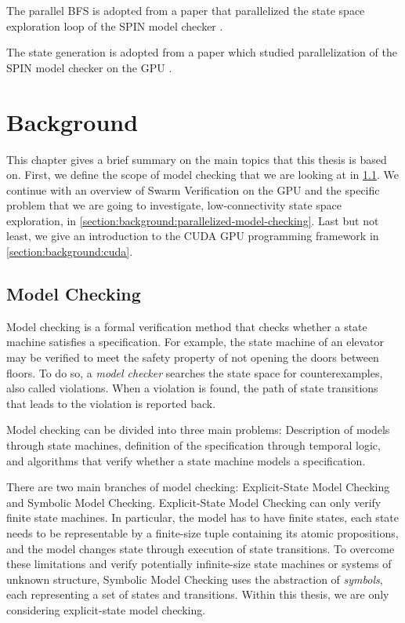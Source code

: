 \documentclass[
fancyheadings, %
%
%
]{stsreprt}
\begin{document}
The parallel BFS is adopted from a paper that parallelized the state space exploration loop of the SPIN model checker \cite{Holzmann2012.Paralellizing-SPIN}.

The state generation is adopted from a paper which studied parallelization of the SPIN model checker on the GPU \cite{Bartocci2014.GPGPU-Parallel-SPIN}.

\chapter{Background}

This chapter gives a brief summary on the main topics that this thesis is based on.
First, we define the scope of model checking that we are looking at in \cref{section:background:model-checking}.
We continue with an overview of Swarm Verification on the GPU and the specific problem that we are going to investigate, low-connectivity state space exploration, in \cref{section:background:parallelized-model-checking}.
Last but not least, we give an introduction to the CUDA GPU programming framework in \cref{section:background:cuda}.

\section{Model Checking}
\label{section:background:model-checking}

Model checking is a formal verification method that checks whether a state machine satisfies a specification.
For example, the state machine of an elevator may be verified to meet the safety property of not opening the doors between floors.
To do so, a \emph{model checker} searches the state space for counterexamples, also called violations.
When a violation is found, the path of state transitions that leads to the violation is reported back.

Model checking can be divided into three main problems:
Description of models through state machines, definition of the specification through temporal logic, and algorithms that verify whether a state machine models a specification.

There are two main branches of model checking:
Explicit-State Model Checking and Symbolic Model Checking.
Explicit-State Model Checking can only verify finite state machines.
In particular, the model has to have finite states, each state needs to be representable by a finite-size tuple containing its atomic propositions, and the model changes state through execution of state transitions.
To overcome these limitations and verify potentially infinite-size state machines or systems of unknown structure, Symbolic Model Checking uses the abstraction of \emph{symbols}, each representing a set of states and transitions.
Within this thesis, we are only considering explicit-state model checking.
\end{document}
